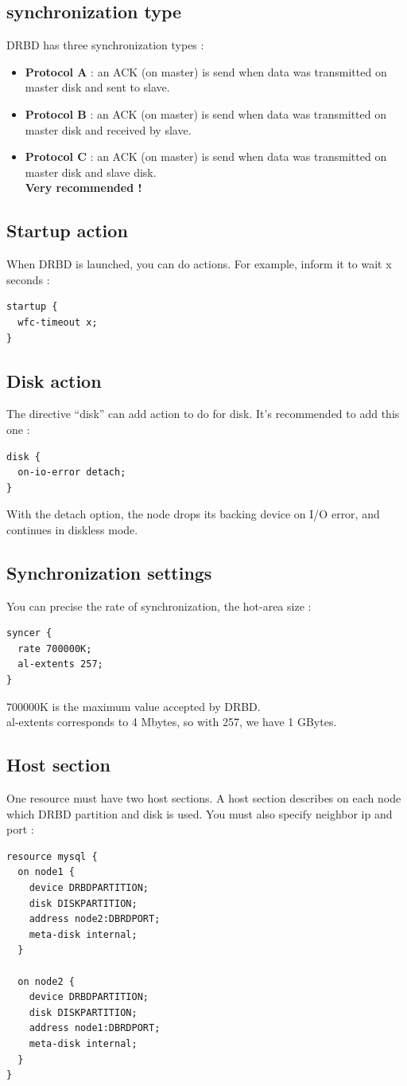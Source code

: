 \documentclass[a4paper,10pt]{report}
\begin{document}
\subsection{synchronization type}
DRBD has three synchronization types :
\begin{itemize}
\item \textbf{Protocol A} : an ACK (on master) is send when data was transmitted on master disk and sent to slave.
\item \textbf{Protocol B} : an ACK (on master) is send when data was transmitted on master disk and received by slave.
\item \textbf{Protocol C} : an ACK (on master) is send when data was transmitted on master disk and slave disk.\\
\textbf{Very recommended !}
\end{itemize}

\subsection{Startup action}
When DRBD is launched, you can do actions. For example, inform it to wait x seconds :
\begin{lstlisting}
startup {
  wfc-timeout x;
}
\end{lstlisting}

\subsection{Disk action}
The directive ``disk'' can add action to do for disk. It's recommended to add this one :
\begin{lstlisting}
disk {
  on-io-error detach;
}
\end{lstlisting}
With the detach option, the node drops its backing device on I/O error, and continues in diskless mode.

\subsection{Synchronization settings}
You can precise the rate of synchronization, the hot-area size :
\begin{lstlisting}
syncer {
  rate 700000K;
  al-extents 257;
}
\end{lstlisting}
700000K is the maximum value accepted by DRBD.\\
al-extents corresponds to 4 Mbytes, so with 257, we have 1 GBytes.

\subsection{Host section}
\label{hostsection} 
One resource must have two host sections. A host section describes on each node which DRBD partition and disk is used. You must also specify neighbor ip and port :
\begin{lstlisting}
resource mysql {
  on node1 {
    device DRBDPARTITION;
    disk DISKPARTITION;
    address node2:DBRDPORT;
    meta-disk internal;
  }

  on node2 {
    device DRBDPARTITION;
    disk DISKPARTITION;
    address node1:DBRDPORT;
    meta-disk internal;
  }
}
\end{lstlisting}
\end{document}
